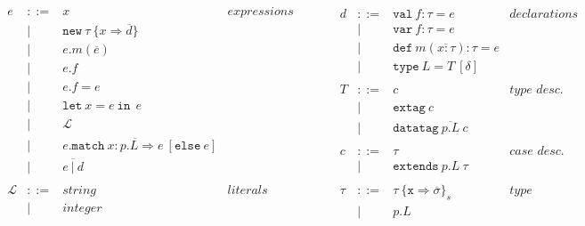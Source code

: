 \documentclass{article}
\newcommand{\keywadj}[1]{\mathtt{#1}}
\newcommand{\keyw}[1]{\keywadj{#1}~}
\begin{document}
\[\begin{array}{lll}
\begin{array}{lllr}
e & ::= & x                                                              & expressions \\
  & |   & \keywadj{new}~\tau~\{x \Rightarrow \overline{d}\}              &\\
  & |   & e.m(\overline{e})                                              &\\
  & |   & e.f                                                            &\\
  & |   & e.f = e                                                        &\\
  & |   & \keyw{let} x=e~\keyw{in}~e                                     &\\
  & |   & \mathscr{L}                                                    &\\
  & |   & e.\keyw{match} \overline{x:p.L \Rightarrow e} ~[\keyw{else} e] &\\
  & |   & \overline{e ~| ~d}                                             &\\
&&\\
\mathscr{L} & ::= & string & literals \\
& | & integer &\\
&&\\
\end{array}
& ~~~~~~
&
\begin{array}{lllr}
d & ::= & \keyw{val} f : \tau = e                    & declarations \\
  & |   & \keyw{var} f : \tau = e                    &\\
  & |   & \keyw{def} m(\overline{x:\tau}) : \tau = e &\\
  & |   & \keyw{type} L = T ~[\delta]                 &\\
&&\\
T & ::= & c                                & \textit{type desc.}\\
  & |   & \keyw{extag} c                   &\\
  & |   & \keyw{datatag} \overline{p.L} ~c &\\
&&\\
c & ::= & \tau                    & \textit{case desc.} \\
  & |   & \keyw{extends} p.L~\tau &\\
&&\\
\tau & ::= & \tau~\{\texttt{x} \Rightarrow \overline{\sigma}\}_{s} & type \\
     & |   & p.L                                                   &\\

\end{array}
\end{array}\]
\end{document}

